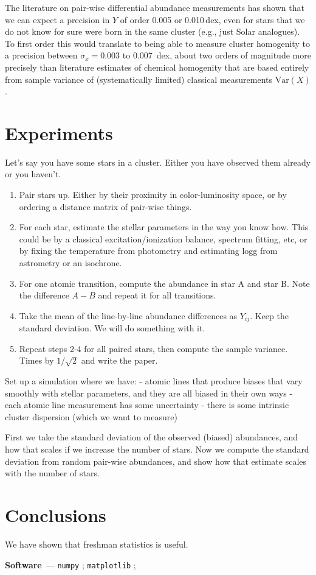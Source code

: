 \documentclass[modern]{aastex631}
\renewcommand{\paragraph}[1]{\medskip\par\noindent\textbf{#1}~---}
\begin{document}
The literature on pair-wise differential abundance measurements has shown that we can expect a precision in $Y$ of order 0.005 or 0.010\,dex, even for stars that we do not know for sure were born in the same cluster (e.g., just Solar analogues). To first order this would translate to being able to measure cluster homogenity to a precision between $\sigma_x = 0.003$ to 0.007~dex, about two orders of magnitude more precisely than literature estimates of chemical homogenity that are based entirely from sample variance of (systematically limited) classical measurements $\mathrm{Var}(X)$.

\section{Experiments} \label{sec:experiments}

Let's say you have some stars in a cluster. Either you have observed them already or you haven't.
\begin{enumerate}
    \item Pair stars up. Either by their proximity in color-luminosity space, or by ordering a distance matrix of pair-wise things.
    \item For each star, estimate the stellar parameters in the way you know how. This could be by a classical excitation/ionization balance, spectrum fitting, etc, or by fixing the temperature from photometry and estimating logg from astrometry or an isochrone.
    \item For one atomic transition, compute the abundance in star A and star B. Note the difference $A-B$ and repeat it for all transitions.
    \item Take the mean of the line-by-line abundance differences as $Y_{ij}$. Keep the standard deviation. We will do something with it.
    \item Repeat steps 2-4 for all paired stars, then compute the sample variance. Times by $1/\sqrt{2}$ and write the paper.
\end{enumerate}

Set up a simulation where we have:
- atomic lines that produce biases that vary smoothly with stellar parameters, and they are all biased in their own ways
- each atomic line measurement has some uncertainty
- there is some intrinsic cluster dispersion (which we want to measure)

First we take the standard deviation of the observed (biased) abundances, and how that scales if we increase the number of stars.
Now we compute the standard deviation from random pair-wise abundances, and show how that estimate scales with the number of stars.


\section{Conclusions} \label{sec:conclusions}
We have shown that freshman statistics is useful.

\paragraph{Software}
\texttt{numpy} \citep{numpy}; 
\texttt{matplotlib} \citep{matplotlib}; 



%
\end{document}
